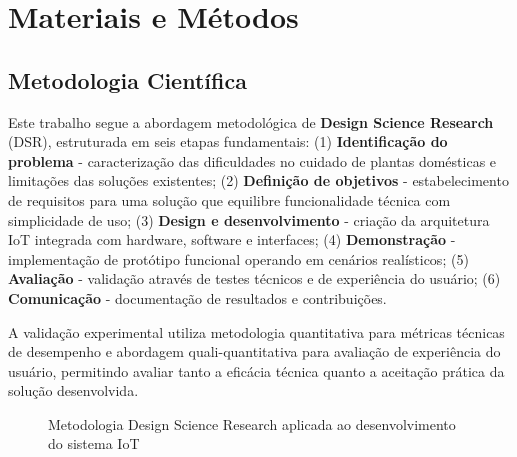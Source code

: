 \documentclass[twoside,english,brazilian]{UNISINOSmonografia}
\begin{document}
\chapter{Materiais e Métodos}

\section{Metodologia Científica}

Este trabalho segue a abordagem metodológica de \textbf{Design Science Research} (DSR), estruturada em seis etapas fundamentais: (1) \textbf{Identificação do problema} - caracterização das dificuldades no cuidado de plantas domésticas e limitações das soluções existentes; (2) \textbf{Definição de objetivos} - estabelecimento de requisitos para uma solução que equilibre funcionalidade técnica com simplicidade de uso; (3) \textbf{Design e desenvolvimento} - criação da arquitetura IoT integrada com hardware, software e interfaces; (4) \textbf{Demonstração} - implementação de protótipo funcional operando em cenários realísticos; (5) \textbf{Avaliação} - validação através de testes técnicos e de experiência do usuário; (6) \textbf{Comunicação} - documentação de resultados e contribuições.

A validação experimental utiliza metodologia quantitativa para métricas técnicas de desempenho e abordagem quali-quantitativa para avaliação de experiência do usuário, permitindo avaliar tanto a eficácia técnica quanto a aceitação prática da solução desenvolvida.

\begin{figure}[htbp]
\centering
\caption{Metodologia Design Science Research aplicada ao desenvolvimento do sistema IoT}
\label{fig:metodologia_dsr}
\end{figure}
\end{document}
